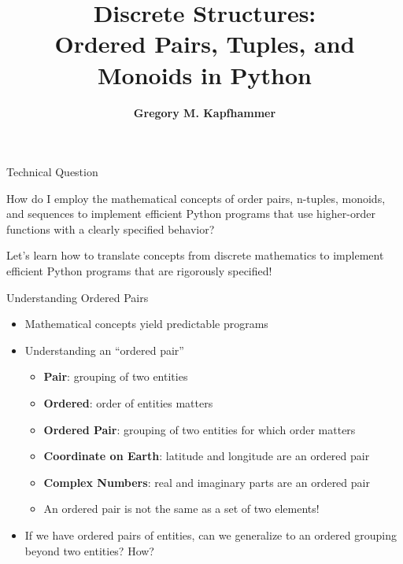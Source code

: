 \documentclass[14pt,aspectratio=169]{beamer}
\title{Discrete Structures: \\ Ordered Pairs, Tuples, and Monoids in Python}
\author{{\bf Gregory M. Kapfhammer}}
\institute[shortinst]{{\bf Department of Computer Science, Allegheny College}}
\begin{document}
{
  \begin{frame}
    \titlepage
  \end{frame}
}

%
\begin{frame}{Technical Question}
  \hspace*{.25in}
  \begin{minipage}{5in}
  \begin{center}
    {\large How do I employ the mathematical concepts of order pairs, n-tuples,
      monoids, and sequences to implement efficient Python programs that use
    higher-order functions with a clearly specified behavior?}
  \end{center}
  \end{minipage}
  \vspace{2ex}
  \begin{center}
    \small Let's learn how to translate concepts from discrete mathematics to
    implement efficient Python programs that are rigorously specified!
  \end{center}
\end{frame}

%
\begin{frame}{Understanding Ordered Pairs}
  \begin{itemize}
    \item Mathematical concepts yield predictable programs
      \vspace*{-.15in}
    \item Understanding an ``ordered pair''
      \begin{itemize}
        \item {\bf Pair}: grouping of two entities
        \item {\bf Ordered}: order of entities matters
        \item {\bf Ordered Pair}: grouping of two entities for which order
          matters
        \item {\bf Coordinate on Earth}: latitude and longitude are an ordered
          pair
        \item {\bf Complex Numbers}: real and imaginary parts are an ordered
          pair
        \item An ordered pair is not the same as a set of two elements!
      \end{itemize}
      \vspace*{-.2in}
    \item If we have ordered pairs of entities, can we generalize to
      an ordered grouping beyond two entities? How?
  \end{itemize}
\end{frame}
\end{document}
